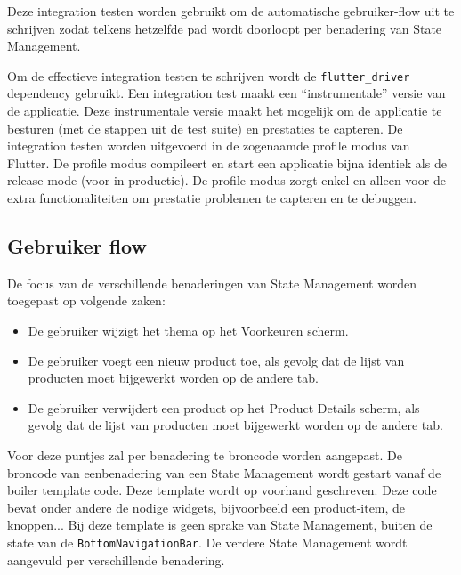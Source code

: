 Deze integration testen worden gebruikt om de automatische gebruiker-flow uit te schrijven zodat telkens hetzelfde pad wordt doorloopt per benadering van State Management.

Om de effectieve integration testen te schrijven wordt de \verb|flutter_driver| dependency gebruikt.
Een integration test maakt een ``instrumentale'' versie van de applicatie. Deze instrumentale versie maakt het mogelijk om de applicatie te besturen (met de stappen uit de test suite) en prestaties te capteren.
De integration testen worden uitgevoerd in de zogenaamde profile modus van Flutter. De profile modus compileert en start een applicatie bijna identiek als de release mode (voor in productie). De profile modus zorgt enkel en alleen voor de extra functionaliteiten om prestatie problemen te capteren en te debuggen.

\subsection{Gebruiker flow}
De focus van de verschillende benaderingen van State Management worden toegepast op volgende zaken: 
\begin{itemize}
    \item De gebruiker wijzigt het thema op het Voorkeuren scherm.
    \item De gebruiker voegt een nieuw product toe, als gevolg dat de lijst van producten moet bijgewerkt worden op de andere tab.
    \item De gebruiker verwijdert een product op het Product Details scherm, als gevolg dat de lijst van producten moet bijgewerkt worden op de andere tab.
\end{itemize}
Voor deze puntjes zal per benadering te broncode worden aangepast. De broncode van eenbenadering van een State Management wordt gestart vanaf de boiler template code. Deze template wordt op voorhand geschreven. Deze code bevat onder andere de nodige widgets, bijvoorbeeld een product-item, de knoppen...
Bij deze template is geen sprake van State Management, buiten de state van de \verb|BottomNavigationBar|. De verdere State Management wordt aangevuld per verschillende benadering.

